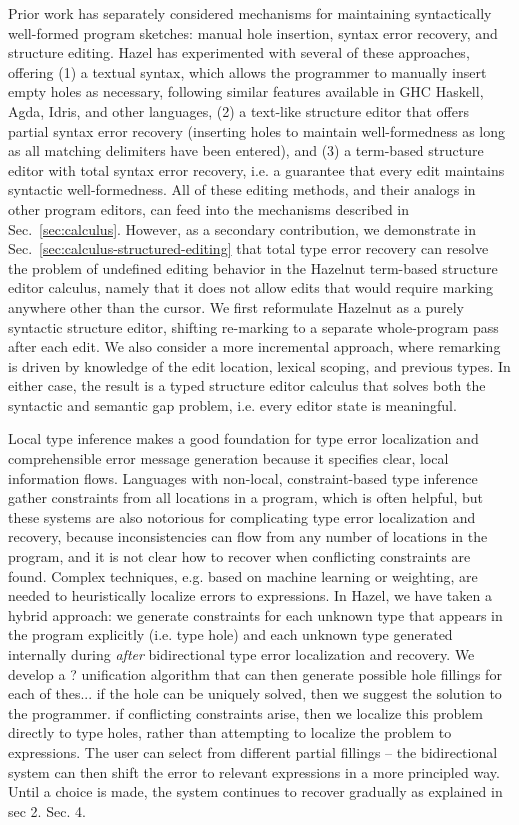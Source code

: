 Prior work has separately considered mechanisms for maintaining syntactically well-formed program sketches: manual hole insertion, syntax error recovery, and structure editing. 
Hazel has experimented with several of these approaches, offering (1) a textual syntax, which allows the programmer to manually insert empty holes as necessary, following similar features available in GHC Haskell, Agda, Idris, and other languages, (2) a text-like structure editor that offers partial syntax error recovery (inserting holes to maintain well-formedness as long as all matching delimiters have been entered), and (3) a term-based structure editor with total syntax error recovery, i.e. a guarantee that every edit maintains syntactic well-formedness. All of these editing methods, and their analogs in other program editors, can feed into the mechanisms described in Sec.~\ref{sec:calculus}. However, as a secondary contribution, 
we demonstrate in Sec.~\ref{sec:calculus-structured-editing} that total type error recovery can resolve the problem of undefined editing behavior in the Hazelnut term-based structure editor calculus, namely that it does not allow edits that would require marking anywhere other than the cursor. We first reformulate Hazelnut as a purely syntactic structure editor, shifting re-marking to a separate whole-program pass after each edit. We also consider a more incremental approach, where remarking is driven by knowledge of the edit location, lexical scoping, and previous types. In either case, the result is a typed structure editor calculus that solves both the syntactic and semantic gap problem, i.e. every editor state is meaningful.

Local type inference makes a good foundation for type error localization and comprehensible error message generation because it specifies clear, local information flows. Languages with non-local, constraint-based type inference gather constraints from all locations in a program, which is often helpful, but these systems are also notorious for complicating type error localization and recovery, because inconsistencies can flow from any number of locations in the program,
and it is not clear how to recover when conflicting constraints are found. 
Complex techniques, e.g. based on machine learning or weighting, are needed to heuristically localize errors to expressions. 
In Hazel, we have taken a hybrid approach: 
we generate constraints for each unknown type that appears in the program explicitly (i.e. type hole) and each unknown type generated internally during \emph{after} bidirectional type error localization and recovery. We develop a ? unification algorithm that can then generate possible hole fillings
for each of thes...
if the hole can be uniquely solved, then we suggest the solution to the programmer. 
if conflicting constraints arise, then we localize this problem directly to type holes, rather 
than attempting to localize the problem to expressions. 
The user can select from different partial fillings -- the bidirectional system can then shift the error to relevant expressions in a more principled way.
Until a choice is made, the system continues to recover gradually as explained in sec 2.
Sec. 4.

